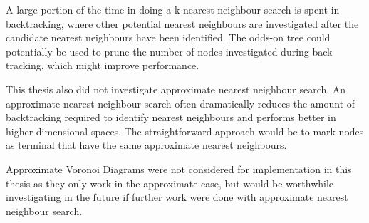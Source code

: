 \documentclass[mcs]{scsthesis}
\begin{document}
A large portion of the time in doing a k-nearest neighbour search is spent in
backtracking, where other potential nearest neighbours are investigated after
the candidate nearest neighbours have been identified. The odds-on tree could
potentially be used to prune the number of nodes investigated during back
tracking, which might improve performance.

This thesis also did not investigate approximate nearest neighbour search. An
approximate nearest neighbour search often dramatically reduces the amount of
backtracking required to identify nearest neighbours and performs better in
higher dimensional spaces. The straightforward approach would be to mark nodes
as terminal that have the same approximate nearest neighbours.

Approximate Voronoi Diagrams \cite{avd} were not considered for implementation
in this thesis as they only work in the approximate case, but would be
worthwhile investigating in the future if further work were done with
approximate nearest neighbour search.
\end{document}
